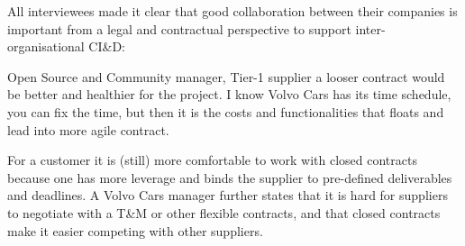All interviewees made it clear that good collaboration between their companies is important from a legal and contractual perspective to support inter-organisational CI\&D:

\begin{aquote}{Open Source and Community manager, Tier-1 supplier}
a looser contract would be better and healthier for the project. I know Volvo Cars has its time schedule, you can fix the time, but then it is the costs and functionalities that floats and lead into more agile contract.
\end{aquote}



 For a customer it is (still) more comfortable to work with closed contracts because one has more leverage and binds the supplier to pre-defined deliverables and deadlines. A Volvo Cars manager %
further states that it is hard for suppliers to negotiate with a T\&M or other flexible contracts, and that closed contracts make it easier competing with other suppliers.



